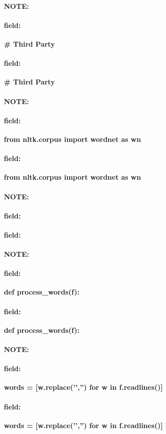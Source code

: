 \documentclass[12pt]{article}
\newenvironment{note}{\paragraph{NOTE:}}{}
\newenvironment{field}{\paragraph{field:}}{}
\begin{document}
\begin{note}
\begin{field}
\textbf{\large # Third Party}
\end{field}
\begin{field}
\textbf{\large # Third Party}
\begin{description}

\end{description}
\end{field}
\end{note}
\begin{note}
\begin{field}
\textbf{\large from nltk.corpus import wordnet as wn}
\end{field}
\begin{field}
\textbf{\large from nltk.corpus import wordnet as wn}
\begin{description}

\end{description}
\end{field}
\end{note}
\begin{note}
\begin{field}
\textbf{\large }
\end{field}
\begin{field}
\textbf{\large }
\begin{description}

\end{description}
\end{field}
\end{note}
\begin{note}
\begin{field}
\textbf{\large def process_words(f):}
\end{field}
\begin{field}
\textbf{\large def process_words(f):}
\begin{description}

\end{description}
\end{field}
\end{note}
\begin{note}
\begin{field}
\textbf{\large words = [w.replace('\n','') for w in f.readlines()]}
\end{field}
\begin{field}
\textbf{\large words = [w.replace('\n','') for w in f.readlines()]}
\begin{description}

\end{description}
\end{field}
\end{note}
\end{document}
